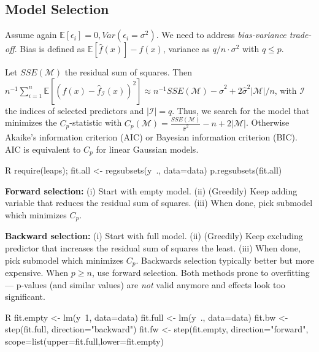 \subsection{Model Selection}\label{subsec:model_selection}
\begin{sectionbox}\nospacing{}
  Assume again $\mathbb{E}[\epsilon_{i}] = 0, Var(\epsilon_{i} = \sigma^{2})$.
  We need to address \emph{bias-variance trade-off}.
  Bias is defined as $\mathbb{E} [\hat f(x)] - f(x)$, variance as $q/n \cdot \sigma^{2}$ with $q \leq p$.
\end{sectionbox}
\begin{sectionbox}\nospacing{}
  Let $SSE(\mathcal{M})$ the residual sum of squares.
  Then $n^{-1} \sum_{i=1}^{n} \mathbb{E}\left[{(f(x) - \hat f_{\mathcal{I}}(x))}^{2}\right] \approx n^{-1}SSE(\mathcal{M})-\hat \sigma^{2} + 2\hat\sigma^{2}|\mathcal{M}|/n$, with $\mathcal{I}$ the indices of selected predictors and $|\mathcal{I}| = q$.
  Thus, we search for the model that minimizes the $C_{p}$-statistic with $C_{p}(\mathcal{M}) = \frac{SSE(\mathcal{M})}{\hat \sigma^{2}} - n + 2|\mathcal{M}|$.
  Otherwise Akaike's information criterion (AIC) or Bayesian information criterion (BIC). AIC is equivalent to $C_{p}$ for linear Gaussian models.
  \begin{mintlinebox}{R}
    require(leaps); fit.all <- regsubsets(y~., data=data)
    p.regsubsets(fit.all)
  \end{mintlinebox}
\end{sectionbox}
\begin{sectionbox}\nospacing{}
  \textbf{Forward selection:} (i) Start with empty model. (ii) (Greedily) Keep adding variable that reduces the residual sum of squares. (iii) When done, pick submodel which minimizes $C_{p}$.

  \textbf{Backward selection:} (i) Start with full model. (ii) (Greedily) Keep excluding predictor that increases the residual sum of squares the least. (iii) When done, pick submodel which minimizes $C_{p}$.
  Backwards selection typically better but more expensive. When $p \geq n$, use forward selection.
  Both methods prone to overfitting --- p-values (and similar values) are \emph{not} valid anymore and effects look too significant.
  \begin{mintlinebox}{R}
    fit.empty <- lm(y~1, data=data)
    fit.full <- lm(y~., data=data)
    fit.bw <- step(fit.full, direction="backward")
    fit.fw <- step(fit.empty, direction="forward", scope=list(upper=fit.full,lower=fit.empty)
  \end{mintlinebox}

\end{sectionbox}

